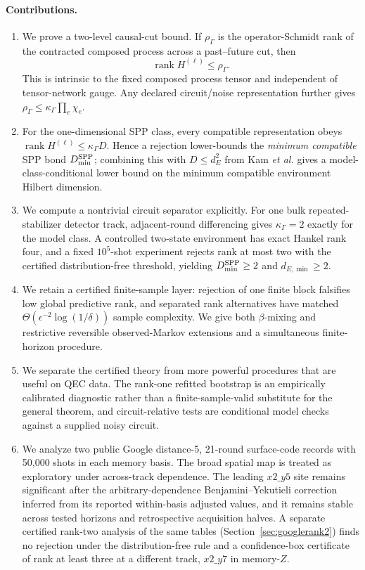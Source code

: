\documentclass[11pt]{article}
\newcommand{\rank}{\operatorname{rank}}
\begin{document}
\paragraph{Contributions.}
\begin{enumerate}[leftmargin=*]
    \item We prove a two-level causal-cut bound. If $\rho_\Gamma$ is the operator-Schmidt rank of the contracted composed process across a past--future cut, then
    \[
        \rank H^{(\ell)}\le \rho_\Gamma.
    \]
    This is intrinsic to the fixed composed process tensor and independent of tensor-network gauge. Any declared circuit/noise representation further gives $\rho_\Gamma\le\kappa_\Gamma\prod_e\chi_e$.
    \item For the one-dimensional SPP class, every compatible representation obeys $\rank H^{(\ell)}\le\kappa_\Gamma D$. Hence a rejection lower-bounds the \emph{minimum compatible} SPP bond $D_{\min}^{\rm SPP}$; combining this with $D\le d_E^2$ from Kam \emph{et al.} gives a model-class-conditional lower bound on the minimum compatible environment Hilbert dimension.
    \item We compute a nontrivial circuit separator explicitly. For one bulk repeated-stabilizer detector track, adjacent-round differencing gives $\kappa_\Gamma=2$ exactly for the model class. A controlled two-state environment has exact Hankel rank four, and a fixed $10^5$-shot experiment rejects rank at most two with the certified distribution-free threshold, yielding $D_{\min}^{\rm SPP}\ge2$ and $d_{E,\min}\ge2$.
    \item We retain a certified finite-sample layer: rejection of one finite block falsifies low global predictive rank, and separated rank alternatives have matched $\Theta(\epsilon^{-2}\log(1/\delta))$ sample complexity. We give both $\beta$-mixing and restrictive reversible observed-Markov extensions and a simultaneous finite-horizon procedure.
    \item We separate the certified theory from more powerful procedures that are useful on QEC data. The rank-one refitted bootstrap is an empirically calibrated diagnostic rather than a finite-sample-valid substitute for the general theorem, and circuit-relative tests are conditional model checks against a supplied noisy circuit.
    \item We analyze two public Google distance-5, 21-round surface-code records with 50,000 shots in each memory basis. The broad spatial map is treated as exploratory under across-track dependence. The leading $x2\_y5$ site remains significant after the arbitrary-dependence Benjamini--Yekutieli correction inferred from its reported within-basis adjusted values, and it remains stable across tested horizons and retrospective acquisition halves. A separate certified rank-two analysis of the same tables (Section~\ref{sec:googlerank2}) finds no rejection under the distribution-free rule and a confidence-box certificate of rank at least three at a different track, $x2\_y7$ in memory-$Z$.
\end{enumerate}
\end{document}
